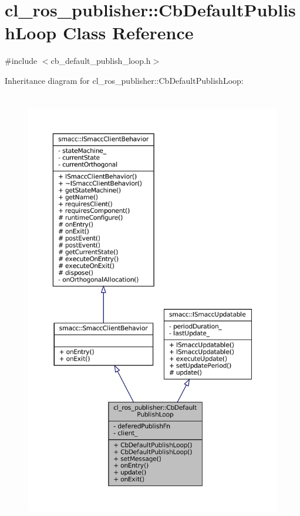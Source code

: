 \hypertarget{classcl__ros__publisher_1_1CbDefaultPublishLoop}{}\section{cl\+\_\+ros\+\_\+publisher\+:\+:Cb\+Default\+Publish\+Loop Class Reference}
\label{classcl__ros__publisher_1_1CbDefaultPublishLoop}


{\ttfamily \#include $<$cb\+\_\+default\+\_\+publish\+\_\+loop.\+h$>$}



Inheritance diagram for cl\+\_\+ros\+\_\+publisher\+:\+:Cb\+Default\+Publish\+Loop\+:
\nopagebreak
\begin{figure}[H]
\begin{center}
\leavevmode
\includegraphics[height=550pt]{classcl__ros__publisher_1_1CbDefaultPublishLoop__inherit__graph}
\end{center}
\end{figure}


